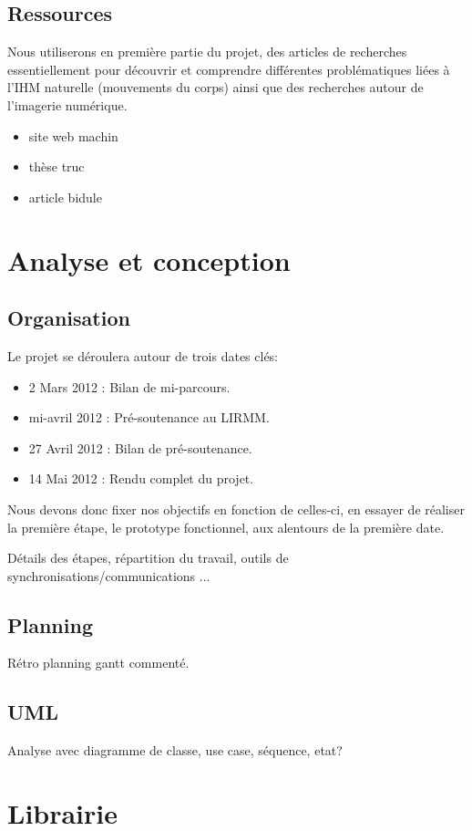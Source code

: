 \documentclass{article}
\begin{document}
		\subsection{Ressources}
		Nous utiliserons en première partie du projet, des articles de recherches essentiellement pour découvrir et comprendre différentes problématiques liées à l'IHM naturelle (mouvements du corps) ainsi que des recherches autour de l'imagerie numérique. \\
			\begin{itemize}
				\item{site web machin}
				\item{thèse truc}
				\item{article bidule}
			\end{itemize}
	\newpage
	\section{Analyse et conception}
		\subsection{Organisation}
		Le projet se déroulera autour de trois dates clés:
			\begin{itemize}
				\item 2 Mars 2012 : Bilan de mi-parcours.
				\item mi-avril 2012 : Pré-soutenance au LIRMM.
				\item 27 Avril 2012 : Bilan de pré-soutenance.
				\item 14 Mai 2012 : Rendu complet du projet.
			\end{itemize}
			Nous devons donc fixer nos objectifs en fonction de celles-ci, en essayer de réaliser la première étape, le prototype fonctionnel, aux alentours de la première date.
		
			Détails des étapes, répartition du travail, outils de synchronisations/communications ...
		\subsection{Planning}
			Rétro planning gantt commenté.
		\subsection{UML}
			Analyse avec diagramme de classe, use case, séquence, etat?
\newpage
	\section{Librairie}
\end{document}
